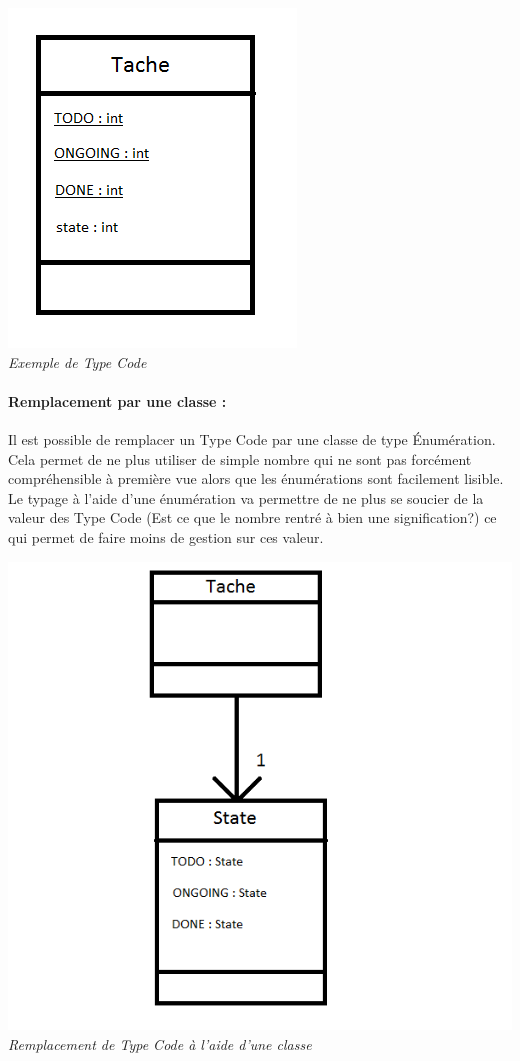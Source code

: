 \documentclass[a4paper,twoside,12pt,openright]{report}
\begin{document}
\begin{center}
\includegraphics[scale=1]{Image/TypeCode.png}\\
\itshape{Exemple de Type Code}
\end{center}

\paragraph{Remplacement par une classe :}
Il est possible de remplacer un Type Code par une classe de type Énumération.\\
Cela permet de ne plus utiliser de simple nombre qui ne sont pas forcément compréhensible à première vue alors que les énumérations sont facilement lisible.\\
Le typage à l'aide d'une énumération va permettre de ne plus se soucier de la valeur des Type Code (Est ce que le nombre rentré à bien une signification?) ce qui permet de faire moins de gestion sur ces valeur.

\begin{center}
\includegraphics[scale=1]{Image/TypeCodeClasse.png}\\
\itshape{Remplacement de Type Code à l'aide d'une classe}
\end{center}
\end{document}
